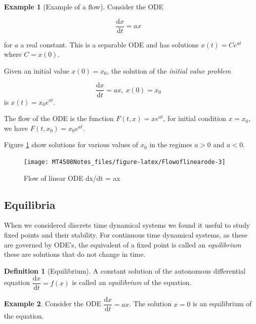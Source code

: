 \documentclass[
  a4paper,
  oneside,
  final]{krantz}
\renewcommand{\d}{\mathrm{d}}
\newcommand{\der}[2]{\dfrac{\d #1}{\d #2}}
\theoremstyle{definition}
\newtheorem{definition}{Definition}[chapter]
\theoremstyle{definition}
\newtheorem{example}{Example}[chapter]
\theoremstyle{definition}
\theoremstyle{definition}
\theoremstyle{remark}
\begin{document}
\begin{example}[Example of a flow]

Consider the ODE

\[ \der{x}{t} = a x \]

for \(a\) a real constant. This is a separable ODE and has solutions \(x(t) = Ce^{at}\) where \(C = x(0)\).

Given an initial value \(x(0) = x_0\), the solution of the \emph{initial value problem}

\[ \der{x}{t} = a x, \ x(0) = x_0 \]
is \(x(t) = x_0 e^{at}\).

The flow of the ODE is the function \(F(t, x) = x e^{at}\), for initial condition \(x = x_0\), we have \(F(t,x_0) = x_0 e^{at}\).

Figure \ref{fig:Flowoflinearode} show solutions for various values of \(x_0\) in the regimes \(a>0\) and \(a<0\).

\begin{figure}

{\centering \texttt{[image: MT4508Notes\_files/figure-latex/Flowoflinearode-3]} 

}

\caption{Flow of linear ODE dx/dt = ax}\label{fig:Flowoflinearode}
\end{figure}

\end{example}

\hypertarget{equilibria}{%
\subsection{Equilibria}\label{equilibria}}

When we considered discrete time dynamical systems we found it useful to study fixed points and their stability. For continuous time dynamical systems, as these are governed by ODE's, the equivalent of a fixed point is called an \emph{equilibrium} these are solutions that do not change in time.

\begin{definition}[Equilibrium]
\protect\hypertarget{def:equilibrium}{}\label{def:equilibrium}A constant solution of the autonomous differential equation \(\der{x}{t} = f(x)\) is called an \emph{equilibrium} of the equation.
\end{definition}

\begin{example}
Consider the ODE \(\der{x}{t} = a x\). The solution \(x=0\) is an equilibrium of the equation.
\end{example}
\end{document}
